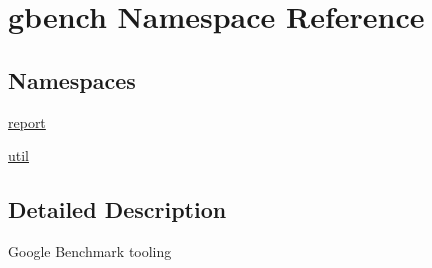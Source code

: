 \hypertarget{namespacegbench}{}\section{gbench Namespace Reference}
\label{namespacegbench}
\subsection*{Namespaces}
\begin{DoxyCompactItemize}
\item 
 \mbox{\hyperlink{namespacegbench_1_1report}{report}}
\item 
 \mbox{\hyperlink{namespacegbench_1_1util}{util}}
\end{DoxyCompactItemize}


\subsection{Detailed Description}
\begin{DoxyVerb}Google Benchmark tooling\end{DoxyVerb}
 